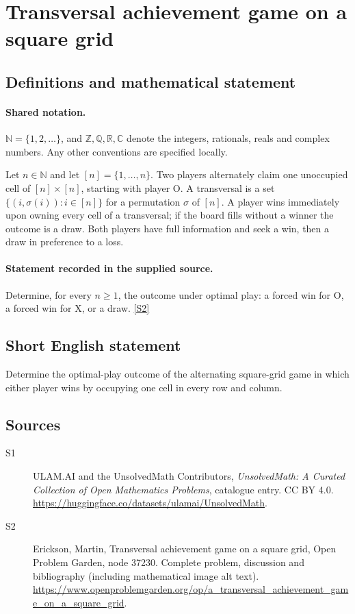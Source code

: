 \documentclass[11pt]{book}
\newcommand{\sref}[2]{\hyperlink{source:#1:#2}{[S#2]}}
\begin{document}
\section{Transversal achievement game on a square grid}\label{statement}

\subsection{Definitions and mathematical statement}

\paragraph{Shared notation.}$\mathbb N=\{1,2,\ldots\}$, and $\mathbb Z,\mathbb Q,\mathbb R,\mathbb C$ denote the integers, rationals, reals and complex numbers. Any other conventions are specified locally.


Let $n\in\mathbb N$ and let $[n]=\{1,\ldots,n\}$. Two players alternately claim one unoccupied cell of $[n]\times[n]$, starting with player O. A transversal is a set $\{(i,\sigma(i)):i\in[n]\}$ for a permutation $\sigma$ of $[n]$. A player wins immediately upon owning every cell of a transversal; if the board fills without a winner the outcome is a draw. Both players have full information and seek a win, then a draw in preference to a loss.
\paragraph{Statement recorded in the supplied source.}
Determine, for every $n\geq1$, the outcome under optimal play: a forced win for O, a forced win for X, or a draw. \sref{statement}{2}
\subsection{Short English statement}
Determine the optimal-play outcome of the alternating square-grid game in which either player wins by occupying one cell in every row and column.
\subsection{Sources}
\begin{description}
\item[\hypertarget{source:statement:1}{S1}] ULAM.AI and the UnsolvedMath Contributors, \emph{UnsolvedMath: A Curated Collection of Open Mathematics Problems}, catalogue entry. CC BY 4.0. \url{https://huggingface.co/datasets/ulamai/UnsolvedMath}.
\item[\hypertarget{source:statement:2}{S2}] Erickson, Martin, Transversal achievement game on a square grid, Open Problem Garden, node 37230. Complete problem, discussion and bibliography (including mathematical image alt text). \url{https://www.openproblemgarden.org/op/a_transversal_achievement_game_on_a_square_grid}.
\end{description}
\label{end:statement}
\end{document}

